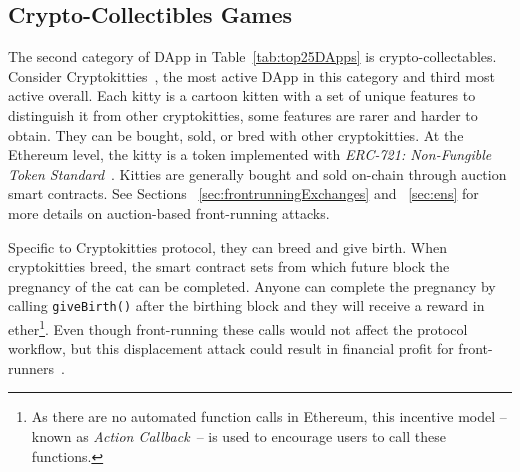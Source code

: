 
\subsection{Crypto-Collectibles Games}\label{sec:cryptogames}

The second category of DApp in Table~\ref{tab:top25DApps} is crypto-collectables. Consider Cryptokitties~\cite{cryptokitties}, the most active DApp in this category and third most active overall. Each kitty is a cartoon kitten with a set of unique features to distinguish it from other cryptokitties, some features are rarer and harder to obtain. They can be bought, sold, or bred with other cryptokitties. At the Ethereum level, the kitty is a token implemented with \textit{ERC-721: Non-Fungible Token Standard}~\cite{erc721}. Kitties are generally bought and sold on-chain through auction smart contracts. See Sections ~\ref{sec:frontrunningExchanges} and ~\ref{sec:ens} for more details on auction-based front-running attacks.


Specific to Cryptokitties protocol, they can breed and give birth. When cryptokitties breed, the smart contract sets from which future block the pregnancy of the cat can be completed. Anyone can complete the pregnancy by calling \texttt{giveBirth()} after the birthing block and they will receive a reward in ether\footnote{As there are no automated function calls in Ethereum, this incentive model --known as \textit{Action Callback}~\cite{klerosGeneralizedFrontrunner2019}-- is used to encourage users to call these functions.}. Even though front-running these calls would not affect the protocol workflow, but this displacement attack could result in financial profit for front-runners~\cite{qin2021attacking,cryptoMidwivesBot2018}.

